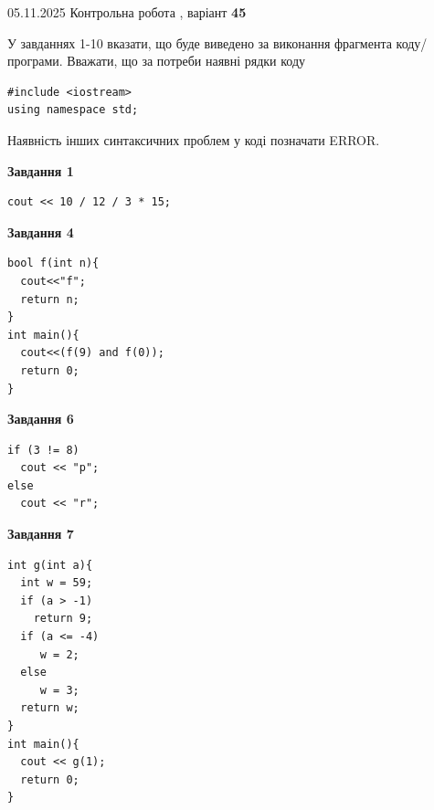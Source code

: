 \documentclass[12pt, ukrainian]{article}
\begin{document}
{\Large{05.11.2025 Контрольна робота , варіант  \No \textbf { 45 }\par}}
{
\begin {large}
У завданнях 1-10 вказати, що буде виведено за виконання фрагмента коду/про\-гра\-ми.
Вважати, що за потреби наявні рядки коду
\begin{verbatim}
#include <iostream>
using namespace std;
\end{verbatim}
Наявність інших синтаксичних проблем у коді позначати ERROR.

\begin{minipage}[t]{7.0cm}

\begin{center}
\textbf{Завдання 1}
\end{center}
\vspace{-8mm}

\begin{verbatim}
cout << 10 / 12 / 3 * 15;
\end{verbatim}



\begin{center}
\textbf{Завдання 4}
\end{center}
\vspace{-8mm}

\begin{verbatim}
bool f(int n){
  cout<<"f";
  return n;
}
int main(){
  cout<<(f(9) and f(0));
  return 0;
}
\end{verbatim}



\begin{center}
\textbf{Завдання 6}
\end{center}
\vspace{-8mm}

\begin{verbatim}
if (3 != 8)
  cout << "p";
else
  cout << "r";
\end{verbatim}



\begin{center}
\textbf{Завдання 7}
\end{center}
\vspace{-8mm}

\begin{verbatim}
int g(int a){
  int w = 59;
  if (a > -1)
    return 9;
  if (a <= -4)
     w = 2;
  else
     w = 3;
  return w;
}
int main(){
  cout << g(1);
  return 0;
}
\end{verbatim}


\end{minipage}
\end{large}}
\end{document}
